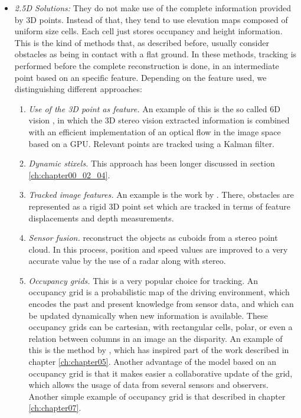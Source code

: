 \begin{itemize}
 \item \emph{2.5D Solutions:} They do not make use of the complete information provided by 3D points. Instead of that, they tend to use elevation maps composed of uniform size cells. Each cell just stores occupancy and height information. This is the kind of methods that, as described before, usually consider obstacles as being in contact with a flat ground.
 In these methods, tracking is performed before the complete reconstruction is done, in an intermediate point based on an specific feature. Depending on the feature used, we distinguishing different approaches:
  \begin{enumerate}
   \item \emph{Use of the 3D point as feature.} An example of this is the so called 6D vision \citep{franke20056d}, in which the 3D stereo vision extracted information is combined with an efficient implementation of an optical flow in the image space based on a \ac{GPU}. Relevant points are tracked using a Kalman filter.
   \item \emph{Dynamic stixels.} This approach has been longer discussed in section \ref{ch:chapter00_02_04}.
   \item \emph{Tracked image features.} An example is the work by \cite{barth2009estimating}. There, obstacles are represented as a rigid 3D point set which are tracked in terms of feature displacements and depth measurements.
   \item \emph{Sensor fusion.} \cite{wu2009collision} reconstruct the objects as cuboids from a stereo point cloud. In this process, position and speed values are improved to a very accurate value by the use of a radar along with stereo.
   \item \emph{Occupancy grids.} This is a very popular choice for tracking. An occupancy grid is a probabilistic map of the driving environment, which encodes the past and present knowledge from sensor data, and which can be updated dynamically when new information is available. These occupancy grids can be cartesian, with rectangular cells, polar, or even a relation between columns in an image an the disparity. An example of this is the method by \cite{danescu2012particle}, which has inspired part of the work described in chapter \ref{ch:chapter05}.
   Another advantage of the model based on an occupancy grid is that it makes easier a collaborative update of the grid, which allows the usage of data from several sensors and observers. Another simple example of occupancy grid is that described in chapter \ref{ch:chapter07}.

\end{enumerate}
\end{itemize}
